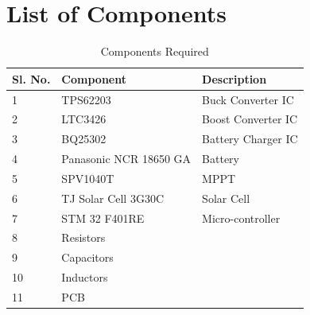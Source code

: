  
 \pagebreak
 \section{List of Components}
 \begin{table}[h]
 	\begin{center}
 		\begin{tabular}{|l|l|l|}
 			\hline
 			{\bf Sl. No.} & {\bf Component} & {\bf Description} \\ \hline
 			1 & TPS62203 & Buck Converter IC \\ \hline
 			2 & LTC3426 & Boost Converter IC \\ \hline
 			3 & BQ25302 & Battery Charger IC \\ \hline
 			4 & Panasonic NCR 18650 GA & Battery \\ \hline
 			5 & SPV1040T & MPPT \\ \hline
 			6 & TJ Solar Cell 3G30C & Solar Cell \\ \hline
 			7 & STM 32 F401RE & Micro-controller \\ \hline
 			8 & Resistors &  \\ \hline
 			9 & Capacitors &  \\ \hline
 			10 & Inductors &  \\ \hline
 			11 & PCB &  \\ \hline
 		\end{tabular}
 		\caption{Components Required}
 		\label{table:3}
 	\end{center}
 \end{table}